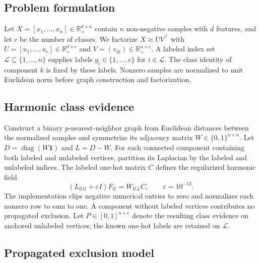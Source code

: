 \documentclass[preprint,12pt]{elsarticle}
\theoremstyle{remark}
\newcommand{\R}{\mathbb{R}}
\newcommand{\eps}{\varepsilon}
\newcommand{\ones}{\mathbf{1}}
\begin{document}
\subsection{Problem formulation}

Let $X=[x_1,\ldots,x_n]\in\R_+^{d\times n}$ contain $n$ non-negative
samples with $d$ features, and let $c$ be the number of classes. We
factorize $X\approx UV^\top$ with
$U=[u_1,\ldots,u_c]\in\R_+^{d\times c}$ and
$V=(v_{ik})\in\R_+^{n\times c}$. A labeled index set
$\mathcal L\subseteq\{1,\ldots,n\}$ supplies labels
$y_i\in\{1,\ldots,c\}$ for $i\in\mathcal L$. The class identity of
component $k$ is fixed by these labels. Nonzero samples are normalized
to unit Euclidean norm before graph construction and factorization.

\subsection{Harmonic class evidence}

Construct a binary $p$-nearest-neighbor graph from Euclidean distances
between the normalized samples and symmetrize its adjacency matrix
$W\in\{0,1\}^{n\times n}$. Let
$D=\operatorname{diag}(W\ones)$ and $L=D-W$. For each connected
component containing both labeled and unlabeled vertices, partition
its Laplacian by the labeled and unlabeled indices. The labeled
one-hot matrix $C$ defines the regularized harmonic field
\begin{equation}
  (L_{\mathcal U\mathcal U}+\eps I)F_{\mathcal U}
   =W_{\mathcal U\mathcal L}C,
  \qquad \eps=10^{-12}.
  \label{eq:harmonic_solver}
\end{equation}
The implementation clips negative numerical entries to zero and
normalizes each nonzero row to sum to one. A component without labeled
vertices contributes no propagated exclusion. Let $P\in[0,1]^{n\times c}$
denote the resulting class evidence on anchored unlabeled vertices;
the known one-hot labels are retained on $\mathcal L$.

\subsection{Propagated exclusion model}
\end{document}
